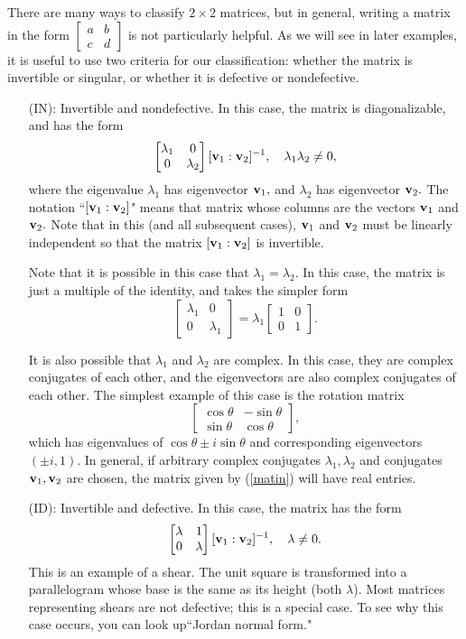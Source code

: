 \documentclass{article}
\def\mat#1#2#3#4{
\left[\begin{matrix}#1&#2\\#3&#4\end{matrix}\right]
}
\begin{document}
There are many ways to classify $2\times2$ matrices, but in general, writing a matrix in the form $\mat abcd$ is not particularly helpful. As we will see in later examples, it is useful to use two criteria for our classification:  whether the matrix is invertible or singular, or whether it is defective or nondefective.

\begin{enumerate}
\item[(IN):] Invertible and nondefective. In this case, the matrix is diagonalizable, and has the form
\begin{equation}[{\bf v}_1:{\bf v}_2]\mat{\lambda_1}00{\lambda_2}[{\bf v}_1:{\bf v}_2]^{-1}, \quad\lambda_1\lambda_2\ne0,\label{matin}
\end{equation}
where the eigenvalue $\lambda_1$ has eigenvector ${\bf v}_1,$ and $\lambda_2$ has eigenvector ${\bf v}_2.$  The notation ``$[{\bf v}_1:{\bf v}_2]$" means that matrix whose columns are the vectors ${\bf v}_1$ and ${\bf v}_2.$ Note that in this (and all subsequent cases), ${\bf v}_1$ and ${\bf v}_2$ must be linearly independent so that the matrix $[{\bf v}_1:{\bf v}_2]$ is invertible.

Note that it is possible in this case that $\lambda_1=\lambda_2.$ In this case, the matrix is just a multiple of the identity, and takes the simpler form
$$\mat{\lambda_1}00{\lambda_1}=\lambda_1\mat1001.$$

It is also possible that $\lambda_1$ and $\lambda_2$ are complex. In this case, they are complex conjugates of each other, and the eigenvectors are also complex conjugates of each other. The simplest example of this case is the rotation matrix
$$\mat{\cos\theta}{-\sin\theta}{\sin\theta}{\cos\theta},$$ which has eigenvalues of $\cos\theta\pm i\sin\theta$ and corresponding eigenvectors $(\pm i,1).$ In general, if arbitrary complex conjugates $\lambda_1,\lambda_2$ and conjugates ${\bf v}_1,{\bf v}_2$ are chosen, the matrix given by (\ref{matin}) will have real entries.

\item[(ID):]  Invertible and defective. In this case, the matrix has the form
\begin{equation}
[{\bf v}_1:{\bf v}_2]\left[\begin{matrix}\lambda&1\\0&\lambda\end{matrix}\right][{\bf v}_1:{\bf v}_2]^{-1},\quad\lambda\ne0.\label{matid}
\end{equation}
This is an example of a shear. The unit square is transformed into a parallelogram whose base is the same as its height (both $\lambda$). Most matrices representing shears are not defective; this is a special case. To see why this case occurs, you can look up``Jordan normal form."


\end{enumerate}
\end{document}
